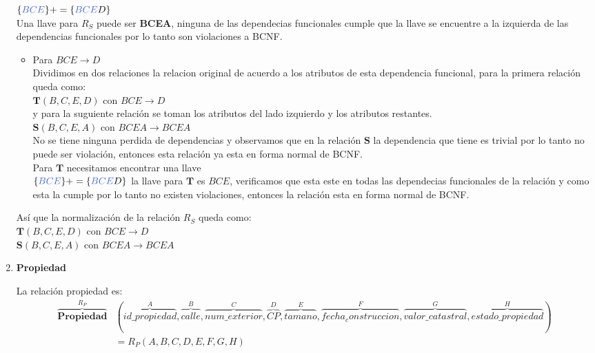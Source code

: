 \documentclass[10pt]{article}
\begin{document}
\begin{enumerate}
    	$\{\textcolor{RoyalBlue}{BCE}\}+= \{\textcolor{RoyalBlue}{BCE}D\}$\\
    	
    	Una llave para $R_S$ puede ser \textbf{BCEA}, ninguna de las dependecias funcionales cumple que la llave se encuentre a la izquierda de las dependencias funcionales por lo tanto son violaciones a BCNF.\\
    	\begin{itemize}
    		\item Para $BCE \rightarrow D$\\
    		Dividimos en dos relaciones la relacion original de acuerdo a los atributos de esta dependencia funcional, para la primera relación queda como:\\
    		
    		$\textbf{T}(B,C,E,D)$ con $BCE \rightarrow D$\\
    		
    		y para la suguiente relación se toman los atributos del lado izquierdo y los atributos restantes.\\
    		
    		$\textbf{S}(B,C,E,A)$ con $BCEA \rightarrow BCEA$\\ 
    		
    		No se tiene ninguna perdida de dependencias y observamos que en la relación
    		$\textbf{S}$ la dependencia que tiene es trivial por lo tanto no puede ser violación, entonces esta relación ya esta en forma normal de BCNF. \\
    		Para $\textbf{T}$  necesitamos encontrar una llave\\
    		$\{\textcolor{RoyalBlue}{BCE}\}+= \{\textcolor{RoyalBlue}{BCE}D\}$ la llave para $\textbf{T}$ es $BCE$, verificamos que esta este en todas las dependecias funcionales de la relación y como esta la cumple por lo tanto no existen violaciones, entonces la relación esta en forma normal de BCNF.\\
    	\end{itemize}
    	Así que la normalización de la relación $R_S$ queda como:\\
    	$\textbf{T}(B,C,E,D)$ con $BCE \rightarrow D$\\
    	$\textbf{S}(B,C,E,A)$ con $BCEA \rightarrow BCEA$\\ 
    	
    	\item \textbf{Propiedad}
    	
    	La relación propiedad es:
    	\begin{align*}
    	\overbrace{{\textbf{Propiedad}}}^{\textbf{$R_{P}$}} &
    	(
    	\overbrace{id\_propiedad}^{A}, \overbrace{calle}^{B},
    	\overbrace{num\_exterior}^{C}, \overbrace{CP}^{D}, \overbrace{tamano}^{E}, \overbrace{fecha_construccion}^{F}, \overbrace{valor\_catastral}^{G}, \overbrace{estado\_propiedad}^{H}
    	)\\
      &	= 
    	\textbf{$R_P$}(A,B,C,D,E,F,G,H)
    	\end{align*}
    	

\end{enumerate}
\end{document}
